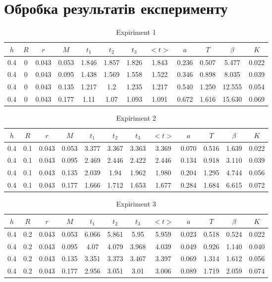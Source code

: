 \documentclass[a4paper,12pt]{article}
\begin{document}
\section{Обробка результатів експерименту}
\begin{table}[htp]
\caption{Expiriment 1}
\centering
\begin{tabular}{|c|c|c|c|c|c|c|c|c|c|c|c|}
\hline
$h$ & $R$ & $r$   & $M$   & $t_1$ & $t_2$ & $t_3$ & $<t>$ & $a$   & $T$   & $\beta$ & $K$   \\ \hline
0.4 & 0   & 0.043 & 0.053 & 1.846 & 1.857 & 1.826 & 1.843 & 0.236 & 0.507 & 5.477   & 0.022 \\ \hline
0.4 & 0   & 0.043 & 0.095 & 1.438 & 1.569 & 1.558 & 1.522 & 0.346 & 0.898 & 8.035   & 0.039 \\ \hline
0.4 & 0   & 0.043 & 0.135 & 1.217 & 1.2   & 1.235 & 1.217 & 0.540 & 1.250 & 12.555  & 0.054 \\ \hline
0.4 & 0   & 0.043 & 0.177 & 1.11  & 1.07  & 1.093 & 1.091 & 0.672 & 1.616 & 15.630  & 0.069 \\ \hline
\end{tabular}
\end{table}
\begin{table}[htp]
\centering
\caption{Expiriment 2}
\begin{tabular}{|c|c|c|c|c|c|c|c|c|c|c|c|}
\hline
$h$ & $R$ & $r$   & $M$   & $t_1$ & $t_2$ & $t_3$ & $<t>$ & $a$   & $T$   & $\beta$ & $K$   \\ \hline
0.4 & 0.1 & 0.043 & 0.053 & 3.377 & 3.367 & 3.363 & 3.369 & 0.070 & 0.516 & 1.639   & 0.022 \\ \hline
0.4 & 0.1 & 0.043 & 0.095 & 2.469 & 2.446 & 2.422 & 2.446 & 0.134 & 0.918 & 3.110   & 0.039 \\ \hline
0.4 & 0.1 & 0.043 & 0.135 & 2.039 & 1.94  & 1.962 & 1.980 & 0.204 & 1.295 & 4.744   & 0.056 \\ \hline
0.4 & 0.1 & 0.043 & 0.177 & 1.666 & 1.712 & 1.653 & 1.677 & 0.284 & 1.684 & 6.615   & 0.072 \\ \hline
\end{tabular}
\end{table}
\begin{table}[htp]
\caption{Expiriment 3}
\centering
\begin{tabular}{|c|c|c|c|c|c|c|c|c|c|c|c|}
\hline
$h$ & $R$ & $r$   & $M$   & $t_1$ & $t_2$ & $t_3$ & $<t>$ & $a$   & $T$   & $\beta$ & $K$   \\ \hline
0.4 & 0.2 & 0.043 & 0.053 & 6.066 & 5.861 & 5.95  & 5.959 & 0.023 & 0.518 & 0.524   & 0.022 \\ \hline
0.4 & 0.2 & 0.043 & 0.095 & 4.07  & 4.079 & 3.968 & 4.039 & 0.049 & 0.926 & 1.140   & 0.040 \\ \hline
0.4 & 0.2 & 0.043 & 0.135 & 3.351 & 3.373 & 3.467 & 3.397 & 0.069 & 1.314 & 1.612   & 0.056 \\ \hline
0.4 & 0.2 & 0.043 & 0.177 & 2.956 & 3.051 & 3.01  & 3.006 & 0.089 & 1.719 & 2.059   & 0.074 \\ \hline
\end{tabular}
\end{table}
\end{document}
